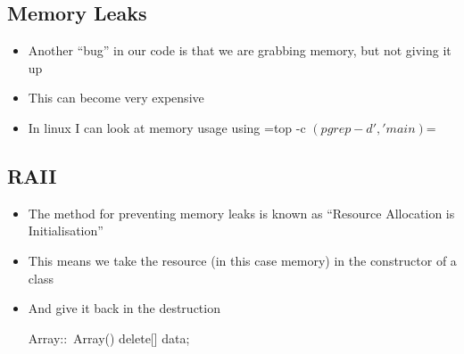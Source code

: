 
\begin{slide}
\section{Memory Leaks}

\begin{itemize}
\item Another ``bug'' in our code is that we are grabbing memory, but
  not giving it up
\item This can become very expensive
\item In linux I can look at memory usage using \jl=top -c $(pgrep -d',' main)$=
\end{itemize}
\end{slide}


\begin{slide}
\section{RAII}

\begin{itemize}
\item The method for preventing memory leaks is known as ``Resource
  Allocation is Initialisation''
\item This means we take the resource (in this case memory) in the
  constructor of a class
\item And give it back in the destruction
  \begin{cpp}
    Array::~Array() {
      delete[] data;
    }
  \end{cpp}
\end{itemize}
\end{slide}


